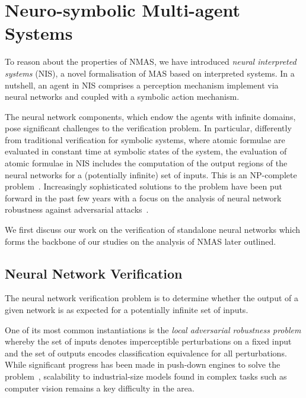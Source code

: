 \documentclass{article}
\begin{document}
\section{Neuro-symbolic Multi-agent Systems}



To reason about the properties of NMAS, we have
introduced {\em neural interpreted systems} (NIS), a novel formalisation of MAS
based on interpreted systems. In a nutshell, an agent in NIS comprises a
perception mechanism implement via neural networks and coupled with a symbolic
action mechanism.  

The neural network components, which endow the agents with infinite domains,
pose significant  challenges to the verification problem.  In particular,
differently from traditional verification for symbolic systems, where atomic
formulae are evaluated in constant time at symbolic states of the system, the
evaluation of atomic formulae in NIS includes the computation of the output
regions of the neural networks  for a (potentially infinite) set of inputs. This is 
 an NP-complete problem~\cite{Katz+17}. Increasingly sophisticated
solutions to the problem have been put forward in the past few years  with a focus on 
the analysis of neural network robustness against adversarial
attacks~\cite{Singh+19,KouvarosLomuscio21,Wang+21}.

We first discuss our work on the verification of standalone neural networks
which forms the backbone of our studies on the analysis of  NMAS later outlined.


\subsection{Neural Network Verification} The neural network verification
problem is to determine whether the output of a given network is as expected for
a potentially infinite set of inputs. 

One of its most common instantiations is
the {\em local adversarial robustness problem} whereby the set of inputs denotes
imperceptible perturbations on a fixed input and the set of outputs encodes
classification equivalence for all perturbations.  
While significant progress has been made in push-down engines to solve the
problem~\cite{Brix+23}, scalability to industrial-size models found in complex
tasks such as computer vision remains a key difficulty in the area.  
\end{document}
